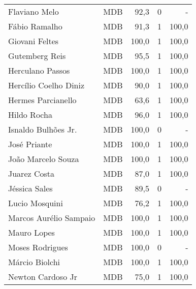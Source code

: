 \begin{longtable}{llrrr}
                       Flaviano Melo &            MDB &      92,3 &            0 &          - \\
                       Fábio Ramalho &            MDB &      91,3 &            1 &      100,0 \\
                      Giovani Feltes &            MDB &     100,0 &            1 &      100,0 \\
                      Gutemberg Reis &            MDB &      95,5 &            1 &      100,0 \\
                    Herculano Passos &            MDB &     100,0 &            1 &      100,0 \\
               Hercílio Coelho Diniz &            MDB &      90,0 &            1 &      100,0 \\
                  Hermes Parcianello &            MDB &      63,6 &            1 &      100,0 \\
                         Hildo Rocha &            MDB &      96,0 &            1 &      100,0 \\
                 Isnaldo Bulhões Jr. &            MDB &     100,0 &            0 &          - \\
                        José Priante &            MDB &     100,0 &            1 &      100,0 \\
                  João Marcelo Souza &            MDB &     100,0 &            1 &      100,0 \\
                        Juarez Costa &            MDB &      87,0 &            1 &      100,0 \\
                       Jéssica Sales &            MDB &      89,5 &            0 &          - \\
                      Lucio Mosquini &            MDB &      76,2 &            1 &      100,0 \\
              Marcos Aurélio Sampaio &            MDB &     100,0 &            1 &      100,0 \\
                         Mauro Lopes &            MDB &     100,0 &            1 &      100,0 \\
                     Moses Rodrigues &            MDB &     100,0 &            0 &          - \\
                      Márcio Biolchi &            MDB &     100,0 &            1 &      100,0 \\
                   Newton Cardoso Jr &            MDB &      75,0 &            1 &      100,0 \\

\end{longtable}
